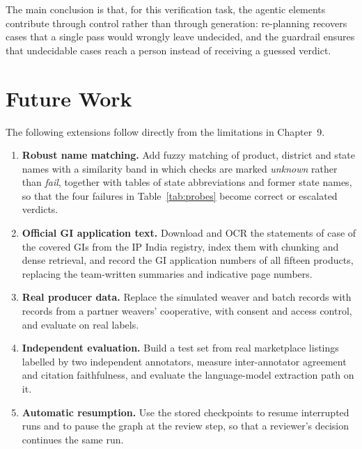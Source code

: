 The main conclusion is that, for this verification task, the agentic elements contribute through
control rather than through generation: re-planning recovers cases that a single pass would wrongly
leave undecided, and the guardrail ensures that undecidable cases reach a person instead of receiving
a guessed verdict.

\section{Future Work}

The following extensions follow directly from the limitations in Chapter~9.

\begin{enumerate}[itemsep=2pt]
\item \textbf{Robust name matching.} Add fuzzy matching of product, district and state names with a
similarity band in which checks are marked \emph{unknown} rather than \emph{fail}, together with tables
of state abbreviations and former state names, so that the four failures in Table~\ref{tab:probes}
become correct or escalated verdicts.
\item \textbf{Official GI application text.} Download and OCR the statements of case of the covered GIs
from the IP India registry, index them with chunking and dense retrieval, and record the GI application
numbers of all fifteen products, replacing the team-written summaries and indicative page numbers.
\item \textbf{Real producer data.} Replace the simulated weaver and batch records with records from a
partner weavers' cooperative, with consent and access control, and evaluate on real labels.
\item \textbf{Independent evaluation.} Build a test set from real marketplace listings labelled by two
independent annotators, measure inter-annotator agreement and citation faithfulness, and evaluate the
language-model extraction path on it.
\item \textbf{Automatic resumption.} Use the stored checkpoints to resume interrupted runs and to pause
the graph at the review step, so that a reviewer's decision continues the same run.
\end{enumerate}
